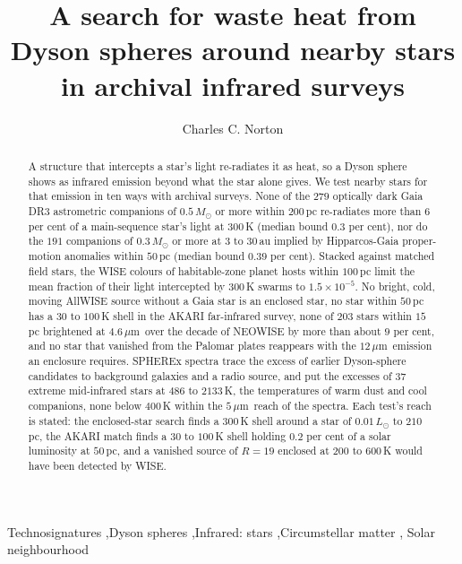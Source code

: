 \documentclass[3p,11pt]{elsarticle}
\newcommand{\um}{\,$\mu$m}
\newcommand{\sci}[2]{#1\times10^{#2}}
\begin{document}
\begin{frontmatter}

\title{A search for waste heat from Dyson spheres around nearby stars in archival infrared surveys}

\author{Charles C. Norton}

\begin{abstract}
A structure that intercepts a star's light re-radiates it as heat, so a Dyson sphere
shows as infrared emission beyond what the star alone gives. We test nearby stars for
that emission in ten ways with archival surveys. None of the $279$ optically dark Gaia
DR3 astrometric companions of $0.5\,M_\odot$ or more within $200$\,pc re-radiates more
than $6$ per cent of a main-sequence star's light at $300$\,K (median bound $0.3$ per
cent), nor do the $191$ companions of $0.3\,M_\odot$ or more at $3$ to $30$\,au implied by
Hipparcos-Gaia proper-motion anomalies within $50$\,pc (median bound $0.39$ per cent).
Stacked against matched field stars, the WISE colours of habitable-zone planet hosts
within $100$\,pc limit the mean fraction of their light intercepted by $300$\,K swarms to
$\sci{1.5}{-5}$. No bright, cold, moving AllWISE source without a Gaia star is an
enclosed star, no star within $50$\,pc has a $30$ to $100$\,K shell in the AKARI
far-infrared survey, none of $203$ stars within $15$\,pc brightened at $4.6$\um\ over the
decade of NEOWISE by more than about $9$ per cent, and no star that vanished from the
Palomar plates reappears with the $12$\um\ emission an enclosure requires. SPHEREx
spectra trace the excess of earlier Dyson-sphere candidates to background galaxies and a
radio source, and put the excesses of $37$ extreme mid-infrared stars at $486$ to
$2133$\,K, the temperatures of warm dust and cool companions, none below $400$\,K within
the $5$\um\ reach of the spectra. Each test's reach is stated: the enclosed-star search
finds a $300$\,K shell around a star of $0.01\,L_\odot$ to $210$\,pc, the AKARI match
finds a $30$ to $100$\,K shell holding $0.2$ per cent of a solar luminosity at $50$\,pc,
and a vanished source of $R=19$ enclosed at $200$ to $600$\,K would have been detected
by WISE.
\end{abstract}

\begin{keyword}
Technosignatures \sep Dyson spheres \sep Infrared: stars \sep Circumstellar matter \sep
Solar neighbourhood
\end{keyword}

\end{frontmatter}
\end{document}
